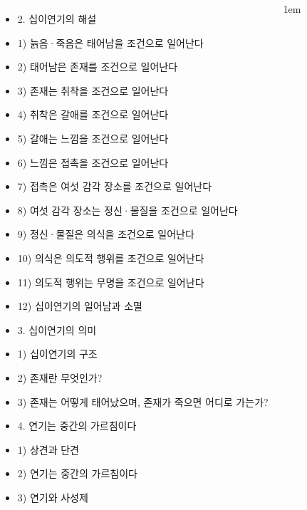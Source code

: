 \documentclass[	14pt, 
							a1paper, 
							portrait, %
							margin=0mm, %
							innermargin=10mm,  		%
							colspace=5mm, 
							subcolspace=0mm
							]{tikzposter}
\begin{document}
\begin{columns}
{\begin{itemize}
					\item 2. 십이연기의 해설
					\item 1) 늙음·죽음은 태어남을 조건으로 일어난다
					\item 2) 태어남은 존재를 조건으로 일어난다
					\item 3) 존재는 취착을 조건으로 일어난다
					\item 4) 취착은 갈애를 조건으로 일어난다
					\item 5) 갈애는 느낌을 조건으로 일어난다
					\item 6) 느낌은 접촉을 조건으로 일어난다
					\item 7) 접촉은 여섯 감각 장소를 조건으로 일어난다
					\item 8) 여섯 감각 장소는 정신·물질을 조건으로 일어난다
					\item 9) 정신·물질은 의식을 조건으로 일어난다
					\item 10) 의식은 의도적 행위를 조건으로 일어난다
					\item 11) 의도적 행위는 무명을 조건으로 일어난다
					\item 12) 십이연기의 일어남과 소멸

					\item 3. 십이연기의 의미
					\item 1) 십이연기의 구조
					\item 2) 존재란 무엇인가?
					\item 3) 존재는 어떻게 태어났으며, 존재가 죽으면 어디로 가는가?
					\item 4. 연기는 중간의 가르침이다
					\item 1) 상견과 단견
					\item 2) 연기는 중간의 가르침이다
					\item 3) 연기와 사성제

					\end{itemize}
			}



			{
					\setlength{\leftmargini}{2em}
					\setlength{\labelsep} {1em}
					\begin{itemize}


\end{itemize}}
\end{columns}
\end{document}
